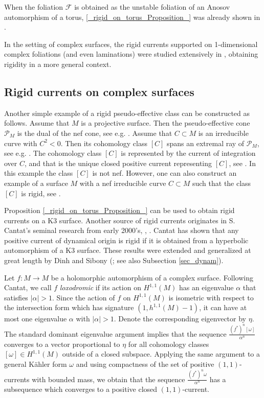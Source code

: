 \documentclass[11pt]{article}
\newcommand{\6}{\partial}
\def\cal{\mathcal}
\newcommand{\PP}{\mathcal{P}}
\begin{document}
When the foliation ${\cal F}$ is obtained as the
unstable foliation of an Anosov automorphism of a torus,
\ref{_rigid_on_torus_Proposition_} was already shown
in \cite[Remarque 2.3]{_Cantat:K3_}.


In the setting of complex surfaces,
the rigid currents supported on 1-dimensional complex
foliations (and even laminations) were studied
extensively in \cite{_Dinh_Nguen_Sibony_}, obtaining
rigidity in a more general context. 


\subsection{Rigid currents on complex surfaces}

Another simple example of a rigid pseudo-effective class can be constructed as follows.
Assume that $M$ is a projective surface. Then the pseudo-effective cone $\PP_M$
is the dual of the nef cone, see e.g. \cite[Theorem 4.1]{Bo}. Assume that $C\subset M$ is an
irreducible curve with $C^2< 0$. Then its cohomology class $[C]$ spans an extremal ray
of $\PP_M$, see e.g. \cite[Theorem 3.21]{Bo}. The cohomology class $[C]$ is represented by
the current of integration over $C$, and that is the unique closed positive current
representing $[C]$, see \cite[Proposition 3.15]{Bo}. In
this example the class $[C]$
is not nef. However, one can also construct an example of a surface $M$ with a
nef irreducible curve $C\subset M$ such that the class
$[C]$ is rigid, see \cite[Example 1.7]{DPS}.

Proposition \ref{_rigid_on_torus_Proposition_}
can be used to obtain rigid currents on a K3 surface.
Another source of rigid currents originates in S. Cantat's
seminal research from early 2000's, \cite{_Cantat:K3_}, \cite{_Cantat:K3-2_}. 
Cantat has shown that
any positive current of dynamical origin is rigid if it is
obtained from a hyperbolic automorphism of a K3 surface. These results
were extended and generalized at great length by Dinh and Sibony
(\cite{DS3}; see also Subsection \ref{sec_dynam}).

Let $f\colon M \to M$ be a holomorphic automorphism of a complex surface.
Following Cantat, we call $f$ {\em loxodromic} if
its action on $H^{1,1}(M)$ has an eigenvalue $\alpha$ that satisfies $|\alpha|>1$.
Since the action of $f$ on $H^{1,1}(M)$ is isometric with
respect to the intersection form which has signature $(1,h^{1,1}(M)-1)$,
it can have at most one eigenvalue $\alpha$ with $|\alpha|>1$.
Denote the corresponding eigenvector by $\eta$.
The standard dominant eigenvalue argument implies
that the sequence $\frac{(f^*)^n[\omega]}{\alpha^n}$
converges to a vector proportional to $\eta$
for all cohomology classes $[\omega]\in H^{1,1}(M)$
outside of a closed subspace. Applying the same
argument to a general K\"ahler form $\omega$ and using
compactness of the set of positive $(1,1)$-currents
with bounded mass, we obtain that the sequence
$\frac{(f^*)^n\omega}{\alpha^n}$ has a subsequence
which converges to a positive closed $(1,1)$-current.
\end{document}
